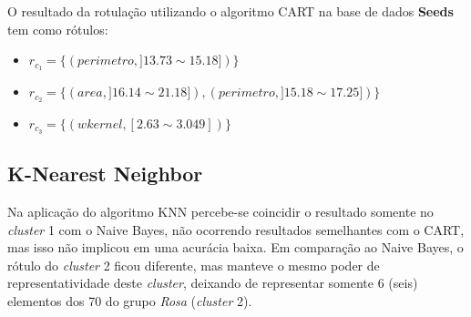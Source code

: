 %     

O resultado da rotulação utilizando o algoritmo CART na base de dados \textbf{Seeds} tem como rótulos: 
\begin{itemize}[noitemsep]
 \item ${r_{c_1}=\{ (perimetro, ]13.73 \sim 15.18]) \} }$
 \item ${r_{c_2}=\{ (area, ]16.14 \sim 21.18]), (perimetro, ]15.18 \sim 17.25]) \} }$
 \item ${r_{c_3}=\{ (wkernel, [2.63 \sim 3.049]) \} }$
\end{itemize}


\subsection{K-Nearest Neighbor} \label{cap:resultados:ssec:seed:knn}

Na aplicação do algoritmo KNN percebe-se coincidir o resultado somente no \textit{cluster} 1 com o Naive Bayes, não ocorrendo resultados semelhantes com o CART, mas isso não implicou em uma acurácia baixa. Em comparação ao Naive Bayes, o rótulo do \textit{cluster} 2 ficou diferente, mas manteve o mesmo poder de representatividade deste \textit{cluster}, deixando de representar somente 6 (seis) elementos dos 70 do grupo \textit{Rosa} (\textit{cluster} 2).

